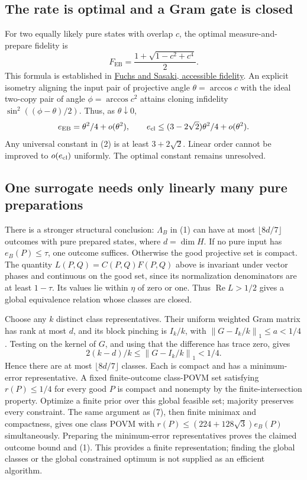 \documentclass[11pt]{article}
\newcommand{\EB}{\operatorname{EB}}
\newcommand{\norm}[1]{\left\lVert#1\right\rVert}
\begin{document}
\subsection{The rate is optimal and a Gram gate is closed}

For two equally likely pure states with overlap $c$, the optimal measure-and-prepare fidelity is
\[
F_{\EB}=\frac{1+\sqrt{1-c^2+c^4}}2.
\]
This formula is established in \href{https://arxiv.org/abs/quant-ph/0302092}{Fuchs and Sasaki, accessible fidelity}. An explicit isometry aligning the input pair of projective angle $\theta=\arccos c$ with the ideal two-copy pair of angle $\phi=\arccos c^2$ attains cloning infidelity $\sin^2((\phi-\theta)/2)$. Thus, as $\theta\downarrow0$,
\[
e_{\EB}=\theta^2/4+o(\theta^2),\qquad
e_{\rm cl}\le(3-2\sqrt2)\theta^2/4+o(\theta^2).
\]
Any universal constant in (2) is at least $3+2\sqrt2$. Linear order cannot be improved to $o(e_{\rm cl})$ uniformly. The optimal constant remains unresolved.

\subsection{One surrogate needs only linearly many pure preparations}

There is a stronger structural conclusion: $\Lambda_B$ in (1) can have at most $\lfloor8d/7\rfloor$ outcomes with pure prepared states, where $d=\dim H$. If no pure input has $e_B(P)\le\tau$, one outcome suffices. Otherwise the good projective set is compact. The quantity $L(P,Q)=C(P,Q)F(P,Q)$ above is invariant under vector phases and continuous on the good set, since its normalization denominators are at least $1-\tau$. Its values lie within $\eta$ of zero or one. Thus $\operatorname{Re}L>1/2$ gives a global equivalence relation whose classes are closed.

Choose any $k$ distinct class representatives. Their uniform weighted Gram matrix has rank at most $d$, and its block pinching is $I_k/k$, with $\norm{G-I_k/k}_1\le a<1/4$. Testing on the kernel of $G$, and using that the difference has trace zero, gives
\[
2(k-d)/k\le\norm{G-I_k/k}_1<1/4.
\]
Hence there are at most $\lfloor8d/7\rfloor$ classes. Each is compact and has a minimum-error representative. A fixed finite-outcome class-POVM set satisfying $r(P)\le1/4$ for every good $P$ is compact and nonempty by the finite-intersection property. Optimize a finite prior over this global feasible set; majority preserves every constraint. The same argument as (7), then finite minimax and compactness, gives one class POVM with $r(P)\le(224+128\sqrt3)e_B(P)$ simultaneously. Preparing the minimum-error representatives proves the claimed outcome bound and (1). This provides a finite representation; finding the global classes or the global constrained optimum is not supplied as an efficient algorithm.
\end{document}

